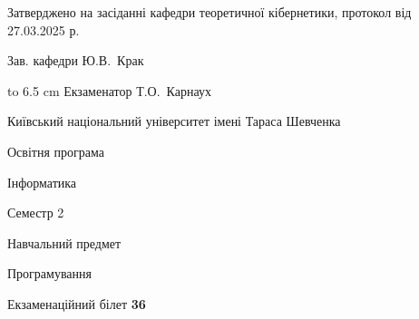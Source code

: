 \documentclass[12pt, ukrainian]{article}
\begin{document}
{\smallskip\smallskip \begin {scriptsize} Затверджено на засіданні кафедри теоретичної кібернетики, протокол   від   27.03.2025 р.\par\smallskip\smallskip\smallskip\smallskip
{\parbox {6.5 cm} {Зав. кафедри \dotfill Ю.В.~Крак}}\hspace {0.7cm} {\hbox to 6.5 cm { Екзаменатор \dotfill Т.О.~Карнаух}} \end{scriptsize}}
\newpage
{{\begin {scriptsize}\par
{ \center  Київський національний університет імені Тараса Шевченка \par}
{\parbox {5 cm}{Освітня програма \hfill}{\parbox {7 cm}{Інформатика\hfill}}\parbox {6 cm}{\hfill Семестр 2}}\par
{\parbox {5 cm} {Навчальний предмет \hfill}\parbox {7 cm}{Програмування \hfill}\parbox {6cm}{\hfill}\par}\vspace{-15pt} \end{scriptsize}}{\center Екзаменаційний білет \No \textbf { 36 }\par}}
\end{document}
